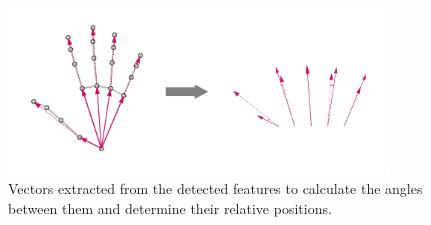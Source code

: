 \begin{figure}
  \centering
  \includegraphics[width=0.9\textwidth, keepaspectratio]{img/hand-vectors.jpg}
  \caption{Vectors extracted from the detected features to calculate the angles between them and determine their relative positions.}
  \label{fig:vector-calcs}
\end{figure}

